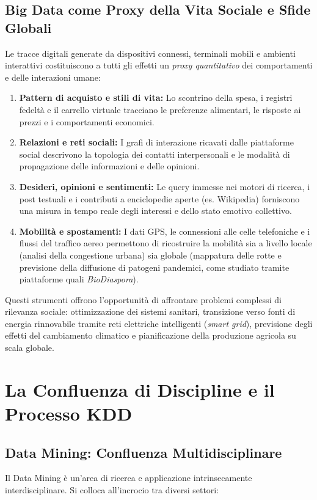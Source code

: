 \subsection{Big Data come Proxy della Vita Sociale e Sfide Globali}
Le tracce digitali generate da dispositivi connessi, terminali mobili e ambienti interattivi costituiscono a tutti gli effetti un \textit{proxy quantitativo} dei comportamenti e delle interazioni umane:

\begin{enumerate}
    \item \textbf{Pattern di acquisto e stili di vita:} Lo scontrino della spesa, i registri fedelt\`a e il carrello virtuale tracciano le preferenze alimentari, le risposte ai prezzi e i comportamenti economici.
    \item \textbf{Relazioni e reti sociali:} I grafi di interazione ricavati dalle piattaforme social descrivono la topologia dei contatti interpersonali e le modalit\`a di propagazione delle informazioni e delle opinioni.
    \item \textbf{Desideri, opinioni e sentimenti:} Le query immesse nei motori di ricerca, i post testuali e i contributi a enciclopedie aperte (es. Wikipedia) forniscono una misura in tempo reale degli interessi e dello stato emotivo collettivo.
    \item \textbf{Mobilit\`a e spostamenti:} I dati GPS, le connessioni alle celle telefoniche e i flussi del traffico aereo permettono di ricostruire la mobilit\`a sia a livello locale (analisi della congestione urbana) sia globale (mappatura delle rotte e previsione della diffusione di patogeni pandemici, come studiato tramite piattaforme quali \textit{BioDiaspora}).
\end{enumerate}

Questi strumenti offrono l'opportunit\`a di affrontare problemi complessi di rilevanza sociale: ottimizzazione dei sistemi sanitari, transizione verso fonti di energia rinnovabile tramite reti elettriche intelligenti (\textit{smart grid}), previsione degli effetti del cambiamento climatico e pianificazione della produzione agricola su scala globale.

\FloatBarrier
\section{La Confluenza di Discipline e il Processo KDD}

\subsection{Data Mining: Confluenza Multidisciplinare}
Il Data Mining \`e un'area di ricerca e applicazione intrinsecamente interdisciplinare. Si colloca all'incrocio tra diversi settori:

